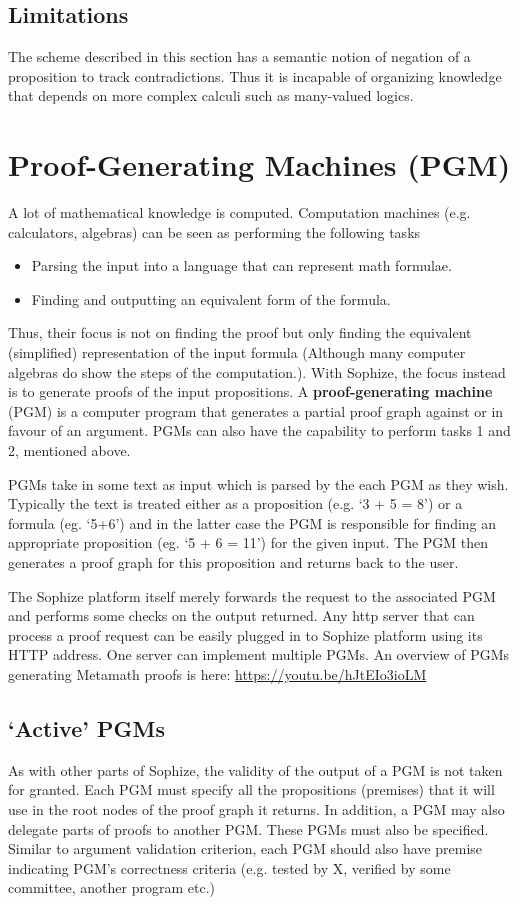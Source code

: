 \documentclass[runningheads]{llncs}
\begin{document}
\subsection{Limitations}
The scheme described in this section has a semantic notion of negation of a proposition to track contradictions. Thus it is incapable of organizing knowledge that depends on more complex calculi such as many-valued logics.

\section{Proof-Generating Machines (PGM)}
\label{sec:pgm}
A lot of mathematical knowledge is computed. Computation machines (e.g. calculators, algebras) can be seen as performing the following tasks
\begin{itemize}
\item Parsing the input into a language that can represent math formulae. 
\item Finding and outputting an equivalent form of the formula.
\end{itemize}
Thus, their focus is not on finding the proof but only finding the equivalent (simplified) representation of the input formula (Although many computer algebras do show the steps of the computation.). With Sophize, the focus instead is to generate proofs of the input propositions. A \textbf{proof-generating machine} (PGM) is a computer program that generates a partial proof graph against or in favour of an argument. PGMs can also have the capability to perform tasks 1 and 2, mentioned above.

PGMs take in some text as input which is parsed by the each PGM as they wish. Typically the text is treated either as a proposition (e.g. `3 + 5 = 8') or a formula (eg. `5+6') and in the latter case the PGM is responsible for finding an appropriate proposition (eg. `5 + 6 = 11') for the given input. The PGM then generates a proof graph for this proposition and returns back to the user.

The Sophize platform itself merely forwards the request to the associated PGM and performs some checks on the output returned. Any http server that can process a proof request can be easily plugged in to Sophize platform using its HTTP address. One server can implement multiple PGMs. An overview of PGMs generating Metamath proofs is here: \url{https://youtu.be/hJtEIo3ioLM}

\subsection{`Active' PGMs}
As with other parts of Sophize, the validity of the output of a PGM is not taken for granted. Each PGM must specify all the propositions (premises) that it will use in the root nodes of the proof graph it returns. In addition, a PGM may also delegate parts of proofs to another PGM. These PGMs must also be specified. Similar to argument validation criterion, each PGM should also have premise indicating PGM's correctness criteria (e.g. tested by X, verified by some committee, another program etc.)
\end{document}

